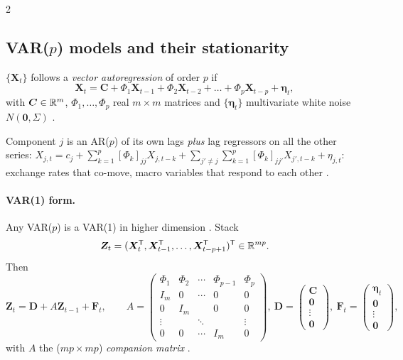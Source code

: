 \begin{paracol}{2}
\subsection{VAR($p$) models and their stationarity}\label{ch09:sec-var-def}
\begin{definition}[VAR($p$)]\label{ch09:def-var}
$\{\bm X_t\}$ follows a \emph{vector autoregression} of order $p$ if
\begin{equation}\label{ch09:eq-var}
  \bm X_t=\bm C+\Phi_1\bm X_{t-1}+\Phi_2\bm X_{t-2}+\dots+\Phi_p\bm X_{t-p}+\bm\eta_t,
\end{equation}
with $\bm C\in\mathbb{R}^m$, $\Phi_1,\dots,\Phi_p$ real $m\times m$ matrices and $\{\bm\eta_t\}$ multivariate white noise
$N(\bm 0,\Sigma)$ .
\end{definition}
Component $j$ is an AR($p$) of its own lags \emph{plus} lag regressors on all the other series:
$X_{j,t}=c_j+\sum_{k=1}^p[\Phi_k]_{jj}X_{j,t-k}+\sum_{j'\ne j}\sum_{k=1}^p[\Phi_k]_{jj'}X_{j',t-k}+\eta_{j,t}$: exchange rates
that co-move, macro variables that respond to each other .

\paragraph{VAR(1) form.} Any VAR($p$) is a VAR(1) in higher dimension . Stack
\[
  \bm Z_t=(\bm X_t^{\mathsf T},\bm X_{t-1}^{\mathsf T},\dots,\bm X_{t-p+1}^{\mathsf T})^{\mathsf T}\in\mathbb{R}^{mp}.
\]
Then
\begin{equation}\label{ch09:eq-companion}
  \bm Z_t=\bm D+A\bm Z_{t-1}+\bm F_t,\qquad
  A=\begin{pmatrix}\Phi_1&\Phi_2&\cdots&\Phi_{p-1}&\Phi_p\\ I_m&0&\cdots&0&0\\ 0&I_m&&0&0\\ \vdots&&\ddots&&\vdots\\ 0&0&\cdots&I_m&0\end{pmatrix},\
  \bm D=\begin{pmatrix}\bm C\\ \bm 0\\ \vdots\\ \bm 0\end{pmatrix},\
  \bm F_t=\begin{pmatrix}\bm\eta_t\\ \bm 0\\ \vdots\\ \bm 0\end{pmatrix},
\end{equation}
with $A$ the ($mp\times mp$) \emph{companion matrix} \ts{13}{11}{50:56}.


\end{paracol}
